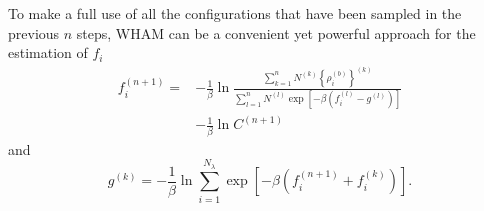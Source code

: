 To make a full use of all the configurations that have been sampled in the previous $n$ steps, WHAM can be a convenient yet powerful approach for the estimation of $f_i$
\begin{equation}
	\begin{aligned}
		f_i^{(n+1)}= & -\frac{1}{\beta} \ln \frac{\sum_{k=1}^n N^{(k)}\left\{\rho_i^{(b)}\right\}^{(k)}}{\sum_{l=1}^n N^{(l)} \exp \left[-\beta\left(f_i^{(l)}-g^{(l)}\right)\right]} \\
		& -\frac{1}{\beta} \ln C^{(n+1)}
	\end{aligned}
\end{equation}
and
\begin{equation}
	g^{(k)}=-\frac{1}{\beta} \ln \sum_{i=1}^{N_\lambda} \exp \left[-\beta\left(f_i^{(n+1)}+f_i^{(k)}\right)\right].
\end{equation}